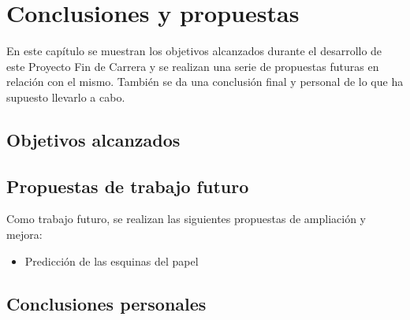 \chapter{Conclusiones y propuestas}
\label{chap:conclusiones}
En este capítulo se muestran los objetivos alcanzados durante el desarrollo de este Proyecto Fin de Carrera y se realizan una serie de propuestas futuras en relación con el mismo. También se da una conclusión final y personal de lo que ha supuesto llevarlo a cabo.



\section{Objetivos alcanzados}

\section{Propuestas de trabajo futuro}
Como trabajo futuro, se realizan las siguientes propuestas de ampliación y mejora:
\begin{itemize}
\item Predicción de las esquinas del papel
\end{itemize}
\section{Conclusiones personales}
